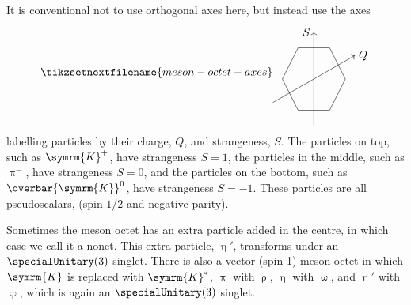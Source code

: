 \documentclass[fleqn]{NotesClass}
\newcommand{\Pparticle}[1]{\symrm{#1}}
\newcommand{\Ppim}{\ensuremath{\uppi^-}}
\newcommand{\PKp}{\ensuremath{\Pparticle{K}^+}}
\newcommand{\Peta}{\ensuremath{\upeta}}
\newcommand{\APantiparticle}[1]{\overbar{#1}}
\newcommand{\APKzero}{\ensuremath{\APantiparticle{\Pparticle{K}}^0}}
\begin{document}
    It is conventional not to use orthogonal axes here, but instead use the axes
    \begin{equation}
        \tikzsetnextfilename{meson-octet-axes}
        \begin{tikzpicture}[
            baseline = (current bounding box)
            ]
            \draw (1/2, 1) -- (1, 0) -- (1/2, -1) -- (-1/2, -1) -- (-1, 0) -- (-1/2, 1) -- cycle;
            \draw[->, rotate=30] (-1.5, 0) -- (1.5, 0) node [right] {\(Q\)};
            \draw[->] (0, -1.5) -- (0, 1.5) node [left] {\(S\)};
        \end{tikzpicture}
    \end{equation}
    labelling particles by their charge, \(Q\), and strangeness, \(S\).
    The particles on top, such as \(\PKp\), have strangeness \(S = 1\), the particles in the middle, such as \(\Ppim\), have strangeness \(S = 0\), and the particles on the bottom, such as \(\APKzero\), have strangeness \(S = -1\).
    These particles are all pseudoscalars, (spin \(1/2\) and negative parity).
    
    Sometimes the meson octet has an extra particle added in the centre, in which case we call it a nonet.
    This extra particle, \(\Peta'\), transforms under an \(\specialUnitary(3)\) singlet.
    There is also a vector (spin 1) meson octet in which \(\symrm{K}\) is replaced with \(\symrm{K}^*\), \(\uppi\) with \(\uprho\), \(\upeta\) with \(\upomega\), and \(\upeta'\) with \(\upvarphi\), which is again an \(\specialUnitary(3)\) singlet.
    
\end{document}
